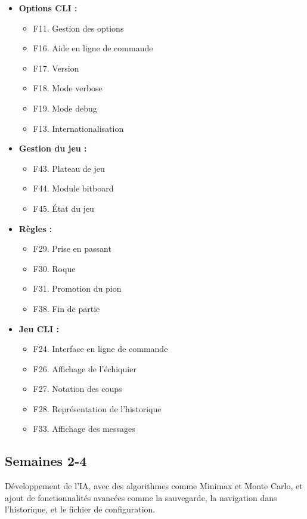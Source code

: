 \documentclass{article}
\begin{document}
\begin{itemize}
    \item \textbf{Options CLI :}
    \begin{itemize}
        \item F11. Gestion des options
        \item F16. Aide en ligne de commande
        \item F17. Version
        \item F18. Mode verbose
        \item F19. Mode debug
        \item F13. Internationalisation
    \end{itemize}
    \item \textbf{Gestion du jeu :}
    \begin{itemize}
        \item F43. Plateau de jeu
        \item F44. Module bitboard
        \item F45. État du jeu
    \end{itemize}
    \item \textbf{Règles :}
    \begin{itemize}
        \item F29. Prise en passant
        \item F30. Roque
        \item F31. Promotion du pion
        \item F38. Fin de partie
    \end{itemize}
    \item \textbf{Jeu CLI :}
    \begin{itemize}
        \item F24. Interface en ligne de commande
        \item F26. Affichage de l’échiquier
        \item F27. Notation des coups
        \item F28. Représentation de l’historique
        \item F33. Affichage des messages
    \end{itemize}
\end{itemize}

\subsection{Semaines 2-4}

Développement de l'IA, avec des algorithmes comme Minimax et Monte Carlo, et ajout de fonctionnalités avancées comme la sauvegarde, la navigation dans l'historique, et le fichier de configuration.
\end{document}
